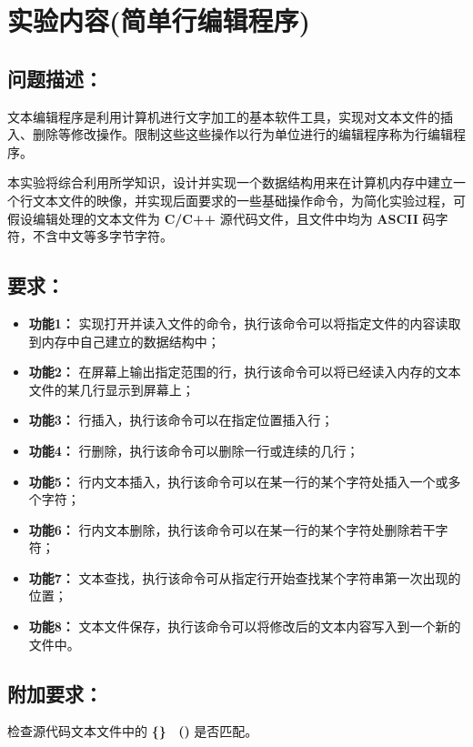 \section{实验内容(简单行编辑程序)}
    \subsection{问题描述：}
        \par 文本编辑程序是利用计算机进行文字加工的基本软件工具，实现对文本文件的插入、删除等修改操作。限制这些这些操作以行为单位进行的编辑程序称为行编辑程序。
        \par 本实验将综合利用所学知识，设计并实现一个数据结构用来在计算机内存中建立一个行文本文件的映像，并实现后面要求的一些基础操作命令，为简化实验过程，可假设编辑处理的文本文件为 \textbf{C/C++} 源代码文件，且文件中均为 \textbf{ASCII} 码字符，不含中文等多字节字符。
    \subsection{要求：}
        \begin{itemize}
            \item \textbf{功能1：} 实现打开并读入文件的命令，执行该命令可以将指定文件的内容读取到内存中自己建立的数据结构中； 
            \item \textbf{功能2：} 在屏幕上输出指定范围的行，执行该命令可以将已经读入内存的文本文件的某几行显示到屏幕上；
            \item \textbf{功能3：} 行插入，执行该命令可以在指定位置插入行；
            \item \textbf{功能4：} 行删除，执行该命令可以删除一行或连续的几行；
            \item \textbf{功能5：} 行内文本插入，执行该命令可以在某一行的某个字符处插入一个或多个字符；
            \item \textbf{功能6：} 行内文本删除，执行该命令可以在某一行的某个字符处删除若干字符；
            \item \textbf{功能7：} 文本查找，执行该命令可从指定行开始查找某个字符串第一次出现的位置；
            \item \textbf{功能8：} 文本文件保存，执行该命令可以将修改后的文本内容写入到一个新的文件中。
        \end{itemize}
    \subsection{附加要求：}
        \par 检查源代码文本文件中的 \textbf{\{\} \ ()} 是否匹配。
        